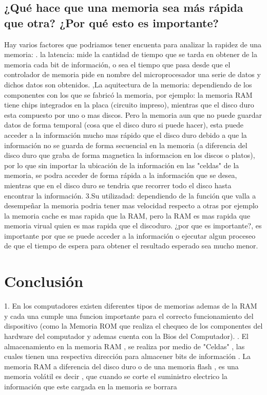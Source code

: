 \documentclass{article}
\begin{document}
\subsection{¿Qué hace que una memoria sea más rápida que otra? ¿Por qué esto es importante?}

Hay varios factores que podriamos tener encuenta para analizar la rapidez de una memoria:
. la latencia: mide la cantidad de tiempo que se tarda en obtener de la memoria cada bit de información, o sea el tiempo que pasa desde que el controlador de memoria pide en nombre del microprocesador
una serie de datos y dichos datos son obtenidos.\cite{Guia}
,La aquitectura de la memoria: dependiendo de los componentes con los que se fabricó la memoria, por ejemplo: la memoria RAM tiene chips integrados en la placa (circuito impreso), mientras que el disco duro esta compuesto por uno o mas discos. Pero la memoria aun que no puede guardar datos de forma temporal (cosa que el disco duro si puede hacer), esta puede acceder a la información mucho mas rápido que el disco duro  debido a que la información no se guarda de forma secuencial en la memoria (a diferencia del disco duro que graba de forma magnetica la informacion en los discos o platos), por lo que sin importar la ubicación de la información en las "celdas" de la memoria, se podra acceder de forma rápida a la información que se desea, mientras que en el disco duro se tendria que recorrer todo el disco hasta encontrar la información.\cite{Quiroga}
\newline
3.Su utilizadad: dependiendo de la función que valla a desempeñar la memoria podria tener mas velocidad respecto a otras por ejemplo la memoria cache es mas rapida que la RAM, pero la RAM es mas rapida que memoria virual quien es mas rapida que el discoduro.
\newline
¿por que es importante?, es importante por que se puede acceder a la información o ejecutar algun proceseo de que el tiempo de espera para obtener el resultado esperado sea mucho menor.

\section{Conclusión} \label{conclulsion}

1. En los computadores existen diferentes tipos de memorias ademas de la RAM y cada una cumple una funcion importante para el correcto funcionamiento del dispositivo (como la Memoria ROM que realiza el chequeo de los componentes del hardware del computador y ademas cuenta con la Bios del Computador).
\newline
{}. El almacenamiento en la memoria RAM , se realiza por medio de "Celdas" , las cuales tienen una respectiva dirección para almacener bits de información
\newline
{}. La memoria RAM a diferencia del disco duro o de una memoria flash , es una memoria volátil es decir , que cuando se corte el suministro electrico la información que este cargada en la memoria se borrara


\end{document}
